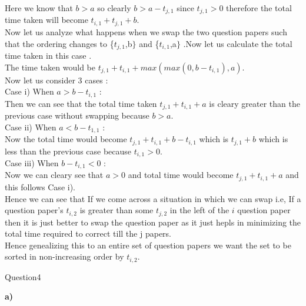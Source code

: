 \documentclass{extarticle}
\theoremstyle{remark}
\newcommand{\tbf}[1]{\textbf{#1}}
\begin{document}
Here we know that $b > a$ so clearly $b > a - t_{j,1}$ since $t_{j,1} > 0$ therefore 
the total time taken will become $t_{i,1} + t_{j,1} + b$.\\

Now let us analyze what happens when we swap the two question papers such that the ordering changes
to \{$t_{j,1}$,b$\}$ and \{$t_{i,1}$,a$\}$ .Now let us calculate the total time taken in this 
case .\\
The time taken would be $t_{j,1} + t_{i,1} + max(max(0,b-t_{i,1}),a)$.\\
Now let us consider 3 cases :\\
Case i) When $a > b-t_{i,1}$ :\\
Then we can see that the total time taken $t_{j,1} + t_{i,1} + a$ is cleary greater than the previous case
without swapping because $b > a$.\\
Case ii) When $a < b-t_{1,1}$ : \\
Now the total time would become $t_{j,1} + t_{i,1} + b - t_{i,1}$ which is $t_{j,1} + b$ which is less than the previous case 
because $t_{i,1} > 0$.\\
Case iii) When $b-t_{i,1} < 0$ : \\
Now we can cleary see that $ a > 0 $ and total time would become $t_{j,1} + t_{i,1} + a$ and 
this follows Case i).\\

Hence we can see that If we come across a situation in which we can swap i.e, If a question
paper's $t_{i,2}$ is greater than some $t_{j,2}$ in the left of the $i$ question paper then it is just better to swap
the question paper as it just hepls in minimizing the total time required to correct till the j papers.\\
Hence genealizing this to an entire set of question papers we want the set to be sorted in 
non-increasing order by $t_{i,2}$.


\Large{Question4}\\
\normalsize

\tbf{a)}\\
\end{document}
